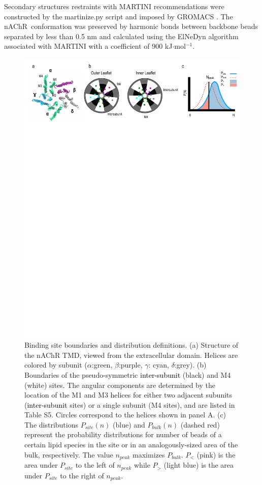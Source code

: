 \documentclass[%
 aip,
 amsmath,amssymb,
 preprint,%
]{revtex4-1}\usepackage{setspace}
\newcommand{\liam}[1]{\textcolor{black}{#1}}
\newcommand{\nachr}{nAChR}
\begin{document}
Secondary structures restraints with MARTINI recommendations were constructed by the martinize.py \cite{DeJong2012} script and imposed by GROMACS \cite{Berendsen1995,Abraham2015}. The \nachr~conformation was preserved by harmonic bonds between backbone beads separated by less than 0.5 nm and calculated using the ElNeDyn algorithm \cite{Periole2009} associated with MARTINI \cite{DeJong2012} with a coefficient of 900 kJ$\cdot$mol$^{-1}$.
\begin{figure}[!h]
	\center
	\includegraphics[width=\linewidth]{PartialBIndingToy.pdf}
	\caption{{ Binding site boundaries and distribution definitions.}  (a) Structure of the \nachr{} TMD\cite{Unwin2005}, viewed from the extracellular domain. Helices are colored by subunit ($\alpha$:green, $\beta$:purple, $\gamma$: cyan, $\delta$:grey). (b) Boundaries of the pseudo-symmetric \liam{inter-subunit} (black) and M4 (white) sites. The angular components are determined by the location of the M1 and M3 helices for either two adjacent subunits (\liam{inter-subunit} sites) or a single subunit (M4 sites), and are listed in Table S5. Circles correspond to the helices shown in panel A.  (c)  The distributions $P_{site} (n)$ (blue) and $P_{bulk}(n)$ (dashed red) represent the probability distributions for number of beads of a certain lipid species in the site or in an analogously-sized area of the bulk, respectively. The value $n_{peak}$ maximizes $P_{bulk}$. $P_<$ (pink) is the area under $P_{site}$ to the left of $n_{peak}$ while $P_>$ (light blue) is the area under $P_{site}$ to the right of $n_{peak}$. }
	\label{fig:PBT}
\end{figure}
\end{document}
